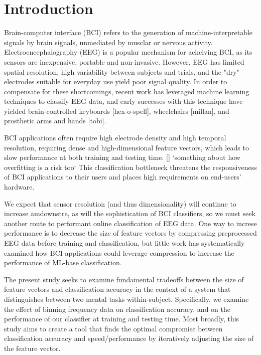 \section{Introduction}

Brain-computer interface (BCI) refers to the generation of machine-interpretable signals by brain signals, unmediated by musclar or nervous activity. Electroencephalography (EEG) is a popular mechanism for acheiving BCI, as its sensors are inexpensive, portable and non-invasive. However, EEG has limited spatial resolution, high variability between subjects and trials, and the "dry" electrodes suitable for everyday use yield poor signal quality. In order to compensate for these shortcomings, recent work has leveraged machine learning techniques to classify EEG data, and early successes with this technique have yielded brain-controlled keyboards [hex-o-spell], wheelchairs [millan], and prosthetic arms and hands [tobi].

BCI applications often require high electrode density and high temporal resolution, requiring dense and high-dimensional feature vectors, which leads to slow performance at both training and testing time. [] `something about how overfitting is a risk too` This classification bottleneck threatens the responsiveness of BCI applications to their users and places high requirements on end-users' hardware.

We expect that sensor resolution (and thus dimensionality) will continue to increase amdownstre, as will the sophistication of BCI classifiers, so we must seek another route to performant online classification of EEG data. One way to increse performance is to decrease the size of feature vectors by compressing preprocessed EEG data before training and classification, but little work has systematically examined how BCI applications could leverage compression to increase the performance of ML-base classification.

The present study seeks to examine fundamental tradeoffs between the size of feature vectors and classification accuracy in the context of a system that distinguishes between two mental tasks within-subject. Specifically, we examine the effect of binning frequency data on classification accuracy, and on the performance of our classifier at training and testing time. Most broadly, this study aims to create a tool that finds the optimal compromise between classification accuracy and speed/performance by iteratively adjusting the size of the feature vector.  